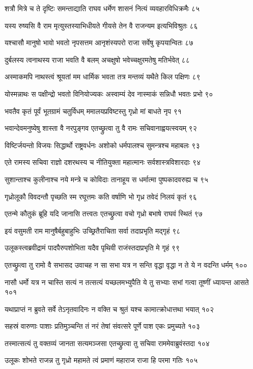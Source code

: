 शत्रौ मित्रे च ते दृष्टिः समन्ताद्याति राघव
धर्मेण शासनं नित्यं व्यवहारविधिक्रमैः ८५

यस्य रुष्यसि वै राम मृत्युस्तस्याभिधीयते
गीयसे तेन वै राजन्यम इत्यभिविश्रुतः ८६

यश्चासौ मानुषो भावो भवतो नृपसत्तम
आनृशंस्यपरो राजा सर्वेषु कृपयान्वितः ८७

दुर्बलस्य त्वनाथस्य राजा भवति वै बलम्
अचक्षुषो भवेच्चक्षुरमतेषु मतिर्भवेत् ८८

अस्माकमपि नाथस्त्वं श्रूयतां मम धार्मिक
भवता तत्र मन्तव्यं यथैते किल पक्षिणः ८९

योस्मन्नाथः स पक्षीन्द्रो भवतो विनियोज्यकः
अस्वाम्यं देव नास्माकं सन्निधौ भवतः प्रभो ९०

भवतैव कृतं पूर्वं भूतग्रामं चतुर्विधम्
ममालयप्रविष्टस्तु गृध्रो मां बाधते नृप ९१

भवान्देवमनुष्येषु शास्ता वै नरपुङ्गव
एतच्छ्रुत्वा तु वै रामः सचिवानाह्वयत्स्वयम् ९२

विष्टिर्जयन्तो विजयः सिद्धार्थो राष्ट्रवर्धनः
अशोको धर्मपालश्च सुमन्त्रश्च महाबलः ९३

एते रामस्य सचिवा राज्ञो दशरथस्य च
नीतियुक्ता महात्मानः सर्वशास्त्रविशारदाः ९४

सुशान्ताश्च कुलीनाश्च नये मन्त्रे च कोविदाः
तानाहूय स धर्मात्मा पुष्पकादवरुह्य च ९५

गृध्रोलूकौ विवदन्तौ पृच्छति स्म रघूत्तमः
कति वर्षाणि भो गृध्र तवेदं निलयं कृतं ९६

एतन्मे कौतुकं ब्रूहि यदि जानासि तत्त्वतः
एतच्छ्रुत्वा वचो गृध्रो बभाषे राघवं स्थितं ९७

इयं वसुमती राम मानुषैर्बहुबाहुभिः
उच्छ्रितैराचिता सर्वा तदाप्रभृति मद्गृहं ९८

उलूकस्त्वब्रवीद्रामं पादपैरुपशोभिता
यदैव पृथिवी राजंस्तदाप्रभृति मे गृहं ९९

एतच्छ्रुत्वा तु रामो वै सभासद उवाचह
न सा सभा यत्र न सन्ति वृद्धा वृद्धा न ते ये न वदन्ति धर्मम् १००

नासौ धर्मो यत्र न चास्ति सत्यं न तत्सत्यं यच्छलमभ्युपैति
ये तु सभ्याः सभां गत्वा तूष्णीं ध्यायन्त आसते १०१

यथाप्राप्तं न ब्रुवते सर्वे तेऽनृतवादिनः
न वक्ति च श्रुतं यश्च कामात्क्रोधात्तथा भयात् १०२

सहस्रं वारुणाः पाशाः प्रतिमुञ्चन्ति तं नरं
तेषां संवत्सरे पूर्णे पाश एकः प्रमुच्यते १०३

तस्मात्सत्यं तु वक्तव्यं जानता सत्यमञ्जसा
एतच्छ्रुत्वा तु सचिवा राममेवाब्रुवंस्तदा १०४

उलूकः शोभते राजन्न तु गृध्रो महामते
त्वं प्रमाणं महाराज राजा हि परमा गतिः १०५

